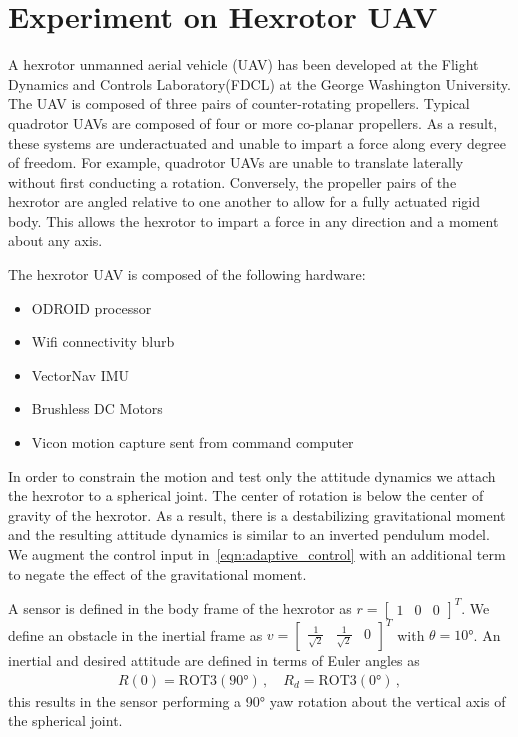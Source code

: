 \documentclass[letterpaper, 10 pt, conference]{ieeeconf}  %
\begin{document}
\section{Experiment on Hexrotor UAV}

A hexrotor unmanned aerial vehicle (UAV) has been developed at the Flight Dynamics and Controls Laboratory(FDCL) at the George Washington University.
The UAV is composed of three pairs of counter-rotating propellers. 
Typical quadrotor UAVs are composed of four or more co-planar propellers.
As a result, these systems are underactuated and unable to impart a force along every degree of freedom.
For example, quadrotor UAVs are unable to translate laterally without first conducting a rotation.
Conversely, the propeller pairs of the hexrotor are angled relative to one another to allow for a fully actuated rigid body.
This allows the hexrotor to impart a force in any direction and a moment about any axis. 

The hexrotor UAV is composed of the following hardware:
\begin{itemize}
	\item ODROID processor 
	\item Wifi connectivity blurb
	\item VectorNav IMU 
	\item Brushless DC Motors 
	\item Vicon motion capture sent from command computer
\end{itemize}
In order to constrain the motion and test only the attitude dynamics we attach the hexrotor to a spherical joint.
The center of rotation is below the center of gravity of the hexrotor.
As a result, there is a destabilizing gravitational moment and the resulting attitude dynamics is similar to an inverted pendulum model.
We augment the control input in~\cref{eqn:adaptive_control} with an additional term to negate the effect of the gravitational moment.

A sensor is defined in the body frame of the hexrotor as \( r = \begin{bmatrix} 1 & 0 & 0 \end{bmatrix}^T \).
We define an obstacle in the inertial frame as \( v = \begin{bmatrix} \frac{1}{\sqrt{2}} & \frac{1}{\sqrt{2}} & 0\end{bmatrix}^T \) with \( \theta = \ang{10} \).
An inertial and desired attitude are defined in terms of Euler angles as
\begin{gather}
	R(0) = \text{ROT3}(\ang{90}) \, , \quad R_d = \text{ROT3}(\ang{0}) \, ,
\end{gather}                                
this results in the sensor performing a \ang{90} yaw rotation about the vertical axis of the spherical joint.
\end{document}
